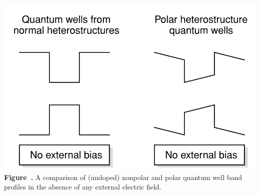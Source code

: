 \begin{center}
	\begin{minipage}{0.6\textwidth}
		\centering
		\includegraphics[width=\textwidth]{img/PolarQuantumWell.png}
		\\[0.5em]
		\textbf{Figure~\thefigure.} A comparison of (undoped) nonpolar and polar quantum well band proﬁles in the absence of any external electric ﬁeld.
		\label{fig:polar_quantum_well}
	\end{minipage}
\end{center}
